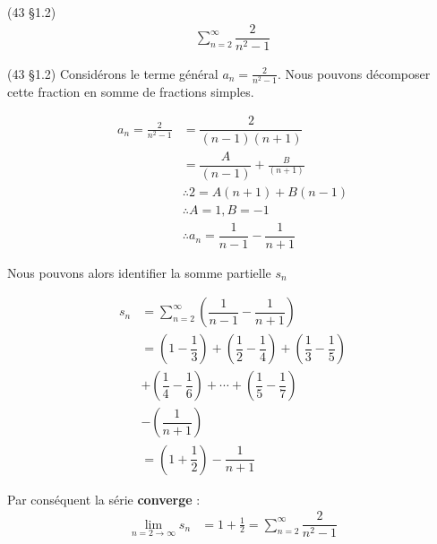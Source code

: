 \documentclass{report}
\begin{document}
\begin{multicols*}{3}
        \begin{Exercice}{(43 \S 1.2)}{}
            \begin{align*}
                \sum_{n=2}^{\infty}\dfrac{2}{n^2 - 1}
            \end{align*}    
        \end{Exercice}


        \begin{Reponse}{(43 \S 1.2)}{}
           Considérons le terme général 
           $a_n = \frac{2}{n^2 -1} $. Nous pouvons décomposer cette 
           fraction en somme de fractions simples. 

           \begin{align*}
               a_n = \frac{2}{n^2 -1} &= 
               \dfrac{2}{(n-1)(n+1)}  \\ 
                                    &=
               \dfrac{A}{(n-1)}  + \frac{B}{(n+1)} \\ 
                                    &\therefore
                2 = A(n+1) + B(n-1) \\ 
                                    &\therefore 
                A = 1, B = - 1 \\ 
                                    &\therefore
                a_n = \dfrac{1}{n-1} - \dfrac{1}{n+1}
           \end{align*}

           Nous pouvons alors identifier la somme partielle $s_n$ 

           \begin{align*}
                s_n &= \sum_{n=2}^{\infty }\left( 
                \dfrac{1}{n-1} - \dfrac{1}{n+1} \right) \\ 
                   &= 
                \left( 1  - \dfrac{1}{3}  \right) + 
                \left( \dfrac{1}{2} - \dfrac{1}{4} \right) + 
                \left( \dfrac{1}{3} - \dfrac{1}{5} \right)  
                 \\
                   &+\left( \dfrac{1}{4} - \dfrac{1}{6} \right)
                   +\cdots + \left( \dfrac{1}{5} - \dfrac{1}{7} \right)
                   \\ 
                   &- \left(\dfrac{1}{n+1} \right) \\
                   &=
                   \left(1 + \dfrac{1}{2} \right ) - \dfrac{1}{n+1}
           \end{align*} 

           Par conséquent la série 
           \textbf{converge} :
           \begin{align*}
               \lim\limits_{n=2\to\infty }s_n &= 
                   1 + \frac{1}{2} = 
                   \sum_{n=2}^{\infty}\dfrac{2}{n^2 -1} 
           \end{align*}
        \end{Reponse}


\end{multicols*}
\end{document}
